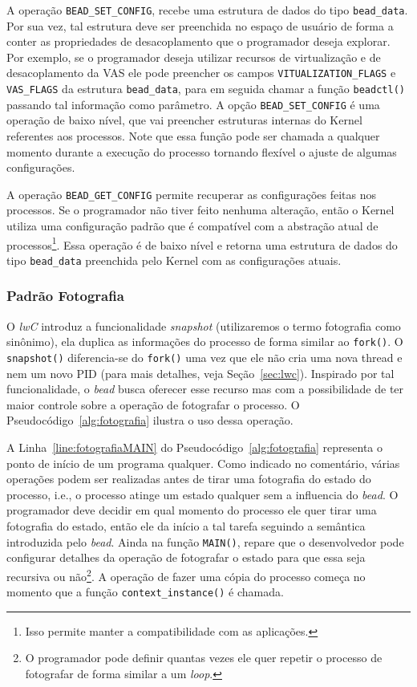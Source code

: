 A operação \texttt{BEAD\_SET\_CONFIG}, recebe uma estrutura de dados do tipo
\texttt{bead\_data}. Por sua vez, tal estrutura deve ser preenchida no espaço
de usuário de forma a conter as propriedades de desacoplamento que o
programador deseja explorar. Por exemplo, se o programador deseja utilizar
recursos de virtualização e de desacoplamento da VAS ele pode preencher os
campos \texttt{VITUALIZATION\_FLAGS} e \texttt{VAS\_FLAGS} da estrutura
\texttt{bead\_data}, para em seguida chamar a função \texttt{beadctl()}
passando tal informação como parâmetro. A opção \texttt{BEAD\_SET\_CONFIG} é
uma operação de baixo nível, que vai preencher estruturas internas do Kernel
referentes aos processos. Note que essa função pode ser chamada a qualquer
momento durante a execução do processo tornando flexível o ajuste de algumas
configurações.

A operação \texttt{BEAD\_GET\_CONFIG} permite recuperar as configurações feitas
nos processos. Se o programador não tiver feito nenhuma alteração, então o
Kernel utiliza uma configuração padrão que é compatível com a abstração atual
de processos\footnote{Isso permite manter a compatibilidade com as
aplicações.}. Essa operação é de baixo nível e retorna uma estrutura de dados
do tipo \texttt{bead\_data} preenchida pelo Kernel com as configurações atuais.

\subsubsection{Padrão Fotografia}

O \emph{lwC} introduz a funcionalidade \emph{snapshot} (utilizaremos o termo
fotografia como sinônimo), ela duplica as informações do processo de forma
similar ao \texttt{fork()}. O \texttt{snapshot()} diferencia-se do
\texttt{fork()} uma vez que ele não cria uma nova thread e nem um novo PID
(para mais detalhes, veja Seção~\ref{sec:lwc}). Inspirado por tal
funcionalidade, o \emph{bead} busca oferecer esse recurso mas com a
possibilidade de ter maior controle sobre a operação de fotografar o processo.
O Pseudocódigo~\ref{alg:fotografia} ilustra o uso dessa operação.



A Linha~\ref{line:fotografiaMAIN} do Pseudocódigo~\ref{alg:fotografia}
representa o ponto de início de um programa qualquer. Como indicado no
comentário, várias operações podem ser realizadas antes de tirar uma fotografia
do estado do processo, i.e., o processo atinge um estado qualquer sem a
influencia do \emph{bead}. O programador deve decidir em qual momento do
processo ele quer tirar uma fotografia do estado, então ele da início a tal
tarefa seguindo a semântica introduzida pelo \emph{bead}. Ainda na função
\texttt{MAIN()}, repare que o desenvolvedor pode configurar detalhes da
operação de fotografar o estado para que essa seja recursiva ou não\footnote{O
programador pode definir quantas vezes ele quer repetir o processo de
fotografar de forma similar a um \emph{loop}.}. A operação de fazer uma cópia
do processo começa no momento que a função \texttt{context\_instance()} é
chamada.

